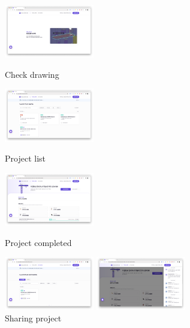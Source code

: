 \begin{itemize}
\begin{itemize}[label=$\star$]
\begin{figure}[!ht]
\begin{fullwidth}
				            \parbox{0.35\textwidth}{
					            \centering
					            \includegraphics[width=0.35\textwidth]{images/builderhub-customer-4.png}
					            \caption*{Check drawing}
				            }
				            \parbox{0.35\textwidth}{
					            \centering
					            \includegraphics[width=0.35\textwidth]{images/builderhub-customer-project-1.png}
					            \caption*{Project list}
				            }\qquad
				            \parbox{0.35\textwidth}{
					            \centering
					            \includegraphics[width=0.35\textwidth]{images/builderhub-customer-project-2.png}
					            \caption*{Project completed}
				            }\qquad
				            \parbox{0.35\textwidth}{
					            \centering
					            \includegraphics[width=0.35\textwidth]{images/builderhub-customer-project-3.png}
					            \caption*{Sharing project}
				            }\qquad
				            \parbox{0.35\textwidth}{
					            \centering
					            \includegraphics[width=0.35\textwidth]{images/builderhub-customer-project-4.png}
}
\end{fullwidth}
\end{figure}
\end{itemize}
\end{itemize}
